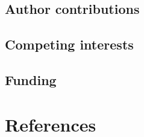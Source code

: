 \documentclass[10pt,a4paper]{article}
\begin{document}
\subsection{Author contributions}\label{author-contributions}

\subsection{Competing interests}\label{competing-interests}

\subsection{Funding}\label{funding}

\section*{References}\label{references}
\end{document}
